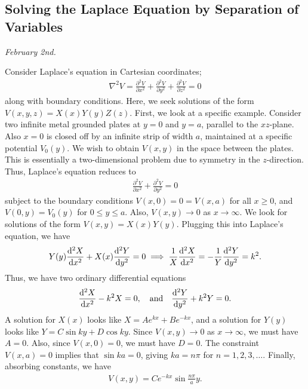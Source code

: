 \subsection{Solving the Laplace Equation by Separation of Variables}
\noindent \textit{February 2nd.}

Consider Laplace's equation in Cartesian coordinates;
\begin{align}
    \nabla^{2} V = \frac{\partial^{2} V}{\partial x^{2}} + \frac{\partial^{2} V}{\partial y^{2}} + \frac{\partial^{2} V}{\partial z^{2}} = 0
\end{align}
along with boundary conditions. Here, we seek solutions of the form $V(x,y,z) = X(x) Y(y) Z(z)$. First, we look at a specific example. Consider two infinite metal grounded plates at $y = 0$ and $y = a$, parallel to the $xz$-plane. Also $x = 0$ is closed off by an infinite strip of width $a$, maintained at a specific potential $V_{0}(y)$. We wish to obtain $V(x,y)$ in the space between the plates. This is essentially a two-dimensional problem due to symmetry in the $z$-direction. Thus, Laplace's equation reduces to
\begin{align}
    \frac{\partial^{2} V}{\partial x^{2}} + \frac{\partial^{2} V}{\partial y^{2}} = 0
\end{align}
subject to the boundary conditions $V(x,0) = 0 = V(x,a)$ for all $x \geq 0$, and $V(0,y) = V_{0}(y)$ for $0 \leq y \leq a$. Also, $V(x,y) \to 0$ as $x \to \infty$. We look for solutions of the form $V(x,y) = X(x) Y(y)$. Plugging this into Laplace's equation, we have
\begin{align}
    Y(y) \frac{\mathrm{d}^{2} X}{\mathrm{d}x^{2}} + X(x) \frac{\mathrm{d}^{2} Y}{\mathrm{d}y^{2}} = 0 \implies \frac{1}{X} \frac{\mathrm{d}^{2} X}{\mathrm{d}x^{2}} = - \frac{1}{Y} \frac{\mathrm{d}^{2} Y}{\mathrm{d}y^{2}} = k^{2}.
\end{align}
Thus, we have two ordinary differential equations
\begin{align}
    \frac{\mathrm{d}^{2} X}{\mathrm{d}x^{2}} - k^{2} X = 0, \quad \text{and} \quad \frac{\mathrm{d}^{2} Y}{\mathrm{d}y^{2}} + k^{2} Y = 0.
\end{align}
A solution for $X(x)$ looks like $X = A e^{kx} + B e^{-kx}$, and a solution for $Y(y)$ looks like $Y = C \sin ky + D \cos ky$. Since $V(x,y) \to 0$ as $x \to \infty$, we must have $A = 0$. Also, since $V(x,0) = 0$, we must have $D = 0$. The constraint $V(x,a) = 0$ implies that $\sin ka = 0$, giving $ka = n\pi$ for $n = 1, 2, 3, \ldots$. Finally, absorbing constants, we have
\begin{align}
    V(x,y) = C e^{-kx} \sin \frac{n \pi}{a}y.
\end{align}
